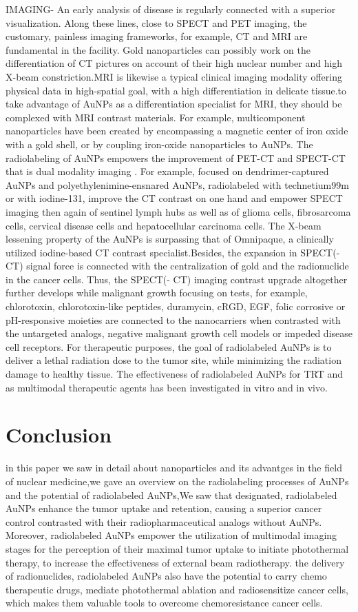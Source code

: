 \documentclass{article}
\begin{document}
 IMAGING- An early analysis of disease is regularly connected with a superior visualization. Along these lines, close to SPECT and PET imaging, the customary, painless imaging frameworks, for example, CT and MRI are fundamental in the facility. Gold nanoparticles can possibly work on the differentiation of CT pictures on account of their high nuclear number and high X-beam constriction.MRI is likewise a typical clinical imaging modality offering physical data in high-spatial goal, with a high differentiation in delicate tissue.to take advantage of AuNPs as a differentiation specialist for MRI, they should be complexed with MRI contrast materials. For example, multicomponent nanoparticles have been created by encompassing a magnetic center of iron oxide with a gold shell, or by coupling iron-oxide nanoparticles to AuNPs. The radiolabeling of AuNPs empowers the improvement of PET-CT and SPECT-CT that is dual modality  imaging . For example, focused on dendrimer-captured AuNPs and polyethylenimine-ensnared AuNPs, radiolabeled with technetium99m or with iodine-131, improve the CT contrast on one hand and empower SPECT imaging then again of sentinel lymph hubs as well as of glioma cells, fibrosarcoma cells, cervical disease cells and hepatocellular carcinoma cells. The X-beam lessening property of the AuNPs is surpassing that of Omnipaque, a clinically utilized iodine-based CT contrast specialist.Besides, the expansion in SPECT(- CT) signal force is connected with the centralization of gold and the radionuclide in the cancer cells. Thus, the SPECT(- CT) imaging contrast upgrade altogether further develops while malignant growth focusing on tests, for example, chlorotoxin, chlorotoxin-like peptides, duramycin, cRGD, EGF, folic corrosive or pH-responsive moieties are connected to the nanocarriers when contrasted with the untargeted analogs, negative malignant growth cell models or impeded disease cell receptors. For therapeutic purposes, the goal of radiolabeled AuNPs is to deliver a lethal radiation dose to the tumor site, while minimizing the radiation damage to healthy tissue. The effectiveness of radiolabeled AuNPs for TRT and as multimodal therapeutic agents has been investigated
in vitro and in vivo.

\section*{Conclusion}
in this paper we saw in detail about nanoparticles and its advantges in the field of nuclear medicine,we gave an overview on the radiolabeling processes of AuNPs and the potential of radiolabeled AuNPs,We saw that designated, radiolabeled AuNPs enhance the tumor uptake and retention, causing a superior cancer control contrasted with their radiopharmaceutical analogs without AuNPs. Moreover, radiolabeled AuNPs empower the utilization of multimodal imaging stages for the perception of their maximal tumor uptake to initiate photothermal therapy, to increase the effectiveness of external beam radiotherapy. the delivery of radionuclides, radiolabeled AuNPs also have the potential to carry chemo therapeutic drugs, mediate photothermal ablation and radiosensitize cancer cells, which makes them valuable tools to overcome chemoresistance cancer cells.
\end{document}
